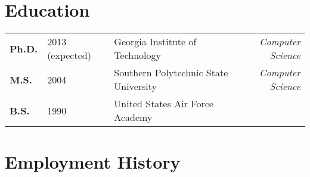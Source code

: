 \documentclass[12pt]{gatech-thesis}
\begin{document}
\begin{postliminary}
{}
\begin{vita}

\section{Education}

\begin{tabular}{lllr}
\textbf{Ph.D.} & 2013 (expected) & Georgia Institute of Technology &
{\sl Computer Science}\\
\textbf{M.S.} &  2004 & Southern Polytechnic State University &
{\sl Computer Science}\\
\textbf{B.S.} & 1990 & United States Air Force Academy & \\
\end{tabular}

\section{Employment History}

\begin{tabular}{llr}


\end{tabular}
\end{vita}
\end{postliminary}
\end{document}
